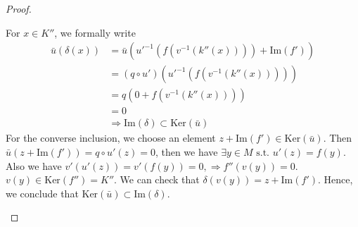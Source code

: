 \documentclass[11pt]{article}
\newcommand{\Lrta}{\Longrightarrow}
\begin{document}
\begin{proof}
\begin{enumerate}
For $x\in K''$, we formally write
$$
\begin{aligned}
\bar{u}(\delta(x))&=\bar{u}\left(u'^{-1}(f(v^{-1}(k''(x))))+\text{Im}(f')\right)\\
&=(q\circ u')\left(u'^{-1}(f(v^{-1}(k''(x))))\right)\\
&=q(0+f(v^{-1}(k''(x))))\\
&=0\\
&\Lrta \text{Im}(\delta)\subset \text{Ker}(\bar{u})
\end{aligned}
$$
For the converse inclusion, we choose an element $z+\text{Im}(f')\in \text{Ker}(\bar{u})$. Then $\bar{u}(z+\text{Im}(f'))=q\circ u'(z)=0$, then we have $\exists y\in M \text{ s.t. } u'(z)=f(y)$. Also we have $v'(u'(z))=v'(f(y))=0,\Lrta f''(v(y))=0$. $v(y)\in \text{Ker}(f'')=K''$. We can check that $\delta(v(y))=z+\text{Im}(f')$. Hence, we conclude that $\text{Ker}(\bar{u})\subset \text{Im}(\delta)$.
\end{enumerate}
\end{proof}
\end{document}
